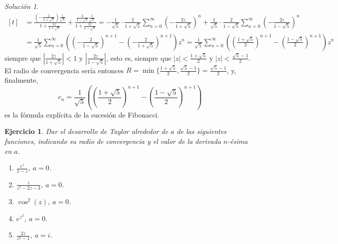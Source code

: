 \documentclass[11pt]{report}
\newcommand{\serie}[2][0]{\sum_{n=#1}^\infty #2}
\newtheorem{exercise}{Ejercicio}
\theoremstyle{remark}
\newtheorem*{resolution}{Solución}
\begin{document}
\begin{resolution}
\[\begin{aligned}[t]
&= \frac{(-\frac{2}{1+\sqrt{5}})\frac{1}{\sqrt{5}}}{1+\frac{2z}{1+\sqrt{5}}}+\frac{\frac{2}{1-\sqrt{5}}\frac{1}{\sqrt{5}}}{1+\frac{2z}{1-\sqrt{5}}} = -\frac{1}{\sqrt{5}}\cdot \frac{2}{1+\sqrt{5}}\serie{\left(-\frac{2z}{1+\sqrt{5}}\right)^n}+\frac{1}{\sqrt{5}}\cdot\frac{2}{1-\sqrt{5}}\serie{\left(-\frac{2z}{1-\sqrt{5}}\right)^n} \\
&=\frac{1}{\sqrt{5}}\serie{\left(\left(-\frac{2}{1-\sqrt{5}}\right)^{n+1}-\left(-\frac{2}{1+\sqrt{5}}\right)^{n+1}\right)z^n} = \frac{1}{\sqrt{5}}\serie{\left(\left(\frac{1+\sqrt{5}}{2}\right)^{n+1}-\left(\frac{1-\sqrt{5}}{2}\right)^{n+1}\right)z^n}
\end{aligned}
\]
siempre que $|\frac{2z}{1+\sqrt{5}}|<1$ y $|\frac{2z}{1-\sqrt{5}}|$, esto es, siempre que $|z|<\frac{1+\sqrt{5}}{2}$ y $|z| < \frac{\sqrt{5}-1}{2}$. El radio de convergencia sería entonces $R = \min\{\frac{1+\sqrt{5}}{2},\frac{\sqrt{5}-1}{2}\} = \frac{\sqrt{5}-1}{2}$, y, finalmente,
\[c_n =\frac{1}{\sqrt{5}}\left(\left(\frac{1+\sqrt{5}}{2}\right)^{n+1}-\left(\frac{1-\sqrt{5}}{2}\right)^{n+1}\right)\]
es la fórmula explícita de la sucesión de Fibonacci.
\end{resolution}

\begin{exercise}
Dar el desarrollo de Taylor alrededor de $a$ de las siguientes funciones, indicando su radio de convergencia y el valor de la derivada $n$-ésima en $a$.
\begin{enumerate}
    \item $\displaystyle \frac{e^z}{1-z}$, $ a=0$.
    \item $\displaystyle \frac{z}{z^2-2z-3}$, $a = 0$.
    \item $\cos^2(z)$, $a = 0$.
    \item $e^{z^2}$, $a = 0$.
    \item $\displaystyle \frac{2z}{z^2-1}$, $a = i$.
\end{enumerate}
\end{exercise}
\end{document}
